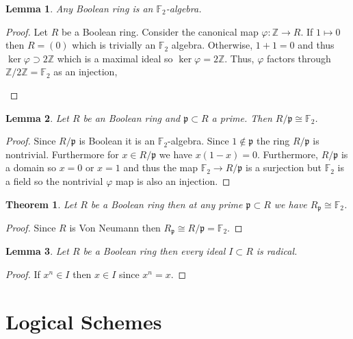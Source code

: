 \documentclass{article}
\newcommand{\p}{\mathfrak{p}}
\newcommand{\F}{\mathbb{F}}
\newcommand{\Z}{\mathbb{Z}}
\newtheorem{thm}{Theorem}
\theoremstyle{plain}
\newtheorem{prop}{Lemma}
\begin{document}
\begin{prop}
Any Boolean ring is an $\F_2$-algebra. 
\end{prop}

\begin{proof}
Let $R$ be a Boolean ring. Consider the canonical map $\varphi : \Z \to R$. If $1 \mapsto 0$ then $R = (0)$ which is trivially an $\F_2$ algebra. Otherwise, $1 + 1 = 0$ and thus $\ker{\varphi} \supset 2 \Z$ which is a maximal ideal so $\ker{\varphi} = 2\Z$. Thus, $\varphi$ factors through $\Z / 2 \Z = \F_2$ as an injection,
\begin{center}
\end{center}  
\end{proof}

\begin{prop}
Let $R$ be an Boolean ring and $\p \subset R$ a prime. Then $R / \p \cong \F_2$.
\end{prop}

\begin{proof}
Since $R / \p$ is Boolean it is an $\F_2$-algebra. Since $1 \notin \p$ the ring $R / \p$ is nontrivial. Furthermore for $x \in R /\p$ we have $x(1 - x) = 0$. Furthermore, $R / \p$ is a domain so $x = 0$ or $x = 1$ and thus the map $\F_2 \to R / \p$ is a surjection but $\F_2$ is a field so the nontrivial $\varphi$ map is also an injection. 
\end{proof}

\begin{thm}
Let $R$ be a Boolean ring then at any prime $\p \subset R$ we have $R_\p \cong \F_2$. 
\end{thm}

\begin{proof}
Since $R$ is Von Neumann then $R_\p \cong R / \p = \F_2$. 
\end{proof}

\begin{prop}
Let $R$ be a Boolean ring then every ideal $I \subset R$ is radical.
\end{prop}

\begin{proof}
If $x^n \in I$ then $x \in I$ since $x^n = x$. 
\end{proof}

\section{Logical Schemes}
\end{document}

